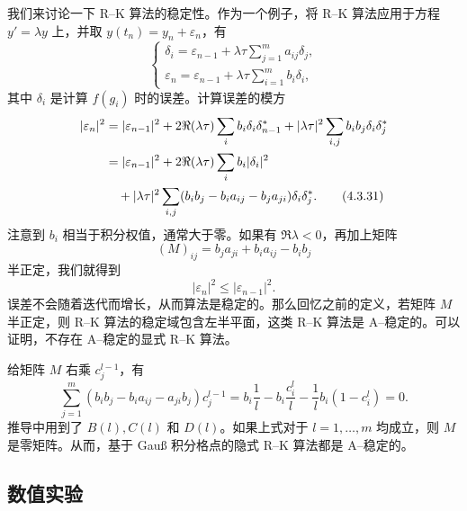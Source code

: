我们来讨论一下 R--K 算法的稳定性。作为一个例子，将 R--K 算法应用于方程 $y'=\lambda y$ 上，并取 $y(t_n)=y_n+\varepsilon_n$，有
\begin{equation}
\begin{cases}
\displaystyle \delta_i=\varepsilon_{n-1}+\lambda\tau\sum_{j=1}^{m}a_{ij}\delta_j,\\[5pt]
\displaystyle \varepsilon_n=\varepsilon_{n-1}+\lambda\tau\sum_{i=1}^{m}b_i\delta_i,
\end{cases}
\tag{4.3.30}
\end{equation}
其中 $\delta_i$ 是计算 $f(g_i)$ 时的误差。计算误差的模方
\begin{align}
 |\varepsilon_n|^2
 &=|\varepsilon_{n-1}|^2+2\Re(\lambda\tau)\sum_i b_i\delta_i\delta_{n-1}^*
   +|\lambda\tau|^2\sum_{i,j}b_ib_j\delta_i\delta_j^*\notag\\
 &=|\varepsilon_{n-1}|^2+2\Re(\lambda\tau)\sum_i b_i|\delta_i|^2\notag\\
 &\quad+|\lambda\tau|^2\sum_{i,j}(b_ib_j-b_i a_{ij}-b_j a_{ji})\delta_i\delta_j^*.
\tag{4.3.31}
\end{align}
注意到 $b_i$ 相当于积分权值，通常大于零。如果有 $\Re\lambda<0$，再加上矩阵
\[
 (M)_{ij}=b_j a_{ji}+b_i a_{ij}-b_i b_j
\]
半正定，我们就得到
\begin{equation}
 |\varepsilon_n|^2\le |\varepsilon_{n-1}|^2.
\tag{4.3.32}
\end{equation}
误差不会随着迭代而增长，从而算法是稳定的。那么回忆之前的定义，若矩阵 $M$ 半正定，则 R--K 算法的稳定域包含左半平面，这类 R--K 算法是 A--稳定的。可以证明，不存在 A--稳定的显式 R--K 算法。

给矩阵 $M$ 右乘 $c_j^{l-1}$，有
\begin{equation}
 \sum_{j=1}^{m}(b_i b_j-b_i a_{ij}-a_{ji}b_j)c_j^{l-1}
 =b_i\frac1l-b_i\frac{c_i^l}{l}-\frac1l b_i(1-c_i^l)=0.
\tag{4.3.33}
\end{equation}
推导中用到了 $B(l),C(l)$ 和 $D(l)$。如果上式对于 $l=1,\ldots,m$ 均成立，则 $M$ 是零矩阵。从而，基于 Gauß 积分格点的隐式 R--K 算法都是 A--稳定的。

\subsection{数值实验}

